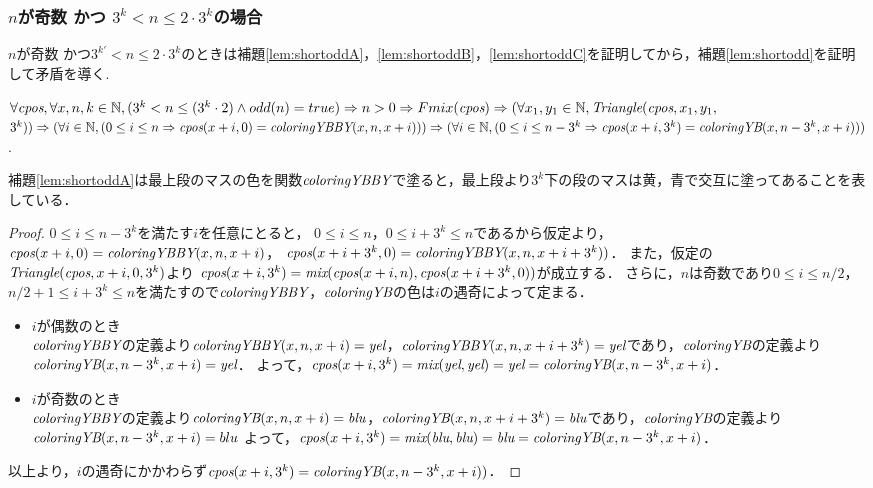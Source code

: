 \subsubsection{$n$が奇数 かつ $3^{k} < n \leq 2 \cdot 3^{k}$の場合}
$n$が奇数 かつ$3^{k'} < n \leq 2 \cdot 3^{k}$のときは補題\ref{lem:shortoddA}，\ref{lem:shortoddB}，\ref{lem:shortoddC}を証明してから，補題\ref{lem:shortodd}を証明して矛盾を導く.
\begin{lem}[\ShortOddA] \label{lem:shortoddA}
  $\forall \textit{cpos}, \forall x, n, k \in \mathbb{N},
  (3^k < n \leq (3^k\cdot2) \land odd(n) = true) \Rightarrow
  n > 0  \Rightarrow Fmix(\textit{cpos}) \Rightarrow 
  (\forall x_1, y_1 \in \mathbb{N}, \textit{Triangle}(\textit{cpos},x_1,y_1,$ $3^k)) \Rightarrow
  (\forall i \in \mathbb{N}, (0 \leq i \leq n \Rightarrow \textit{cpos}(x+i,0) = \textit{coloringYBBY}(x,n,x+i))) \Rightarrow
  (\forall i \in \mathbb{N}, (0 \leq i \leq n - 3^k \Rightarrow \textit{cpos}(x+i,3^k) = \textit{coloringYB}(x,n-3^k,x+i)))$.
\end{lem}
補題\ref{lem:shortoddA}は最上段のマスの色を関数$\textit{coloringYBBY}$で塗ると，最上段より$3^k$下の段のマスは黄，青で交互に塗ってあることを表している．
\begin{proof}
  $0 \leq i \leq n-3^k$を満たす$i$を任意にとると，
  $0 \leq i \leq n$，$0 \leq i+3^k \leq n$であるから仮定より，
  $\textit{cpos}(x+i,0) = \textit{coloringYBBY}(x,n,x+i)$，
  $\textit{cpos}(x+i+3^k,0) = \textit{coloringYBBY}(x,n,x+i+3^k))$．
  また，仮定の$\textit{Triangle}(\textit{cpos},x+i,0,3^k)$より
  $\textit{cpos}(x+i,3^k)=\textit{mix}(\textit{cpos}(x+i,n),\textit{cpos}(x+i+3^k,0))$が成立する．
  さらに，$n$は奇数であり$0 \leq i \leq n/2$，$n/2+1 \leq i+3^k \leq n$を満たすので$\textit{coloringYBBY}$，$\textit{coloringYB}$の色は$i$の遇奇によって定まる．
  \begin{itemize}
  \item
    $i$が偶数のとき \\
    $\textit{coloringYBBY}$の定義より$\textit{coloringYBBY}(x,n,x+i)=\textit{yel}$，$\textit{coloringYBBY}(x,n,x+i+3^k)=\textit{yel}$であり，$\textit{coloringYB}$の定義より$\textit{coloringYB}(x,n-3^k,x+i)=\textit{yel}$．
    よって，$\textit{cpos}(x+i,3^k)=\textit{mix}(\textit{yel},\textit{yel})=\textit{yel}=\textit{coloringYB}(x,n-3^k,x+i)$．
  \item
    $i$が奇数のとき \\
    $\textit{coloringYBBY}$の定義より$\textit{coloringYB}(x,n,x+i)=\textit{blu}$，$\textit{coloringYB}(x,n,x+i+3^k)=\textit{blu}$であり，$\textit{coloringYB}$の定義より$\textit{coloringYB}(x,n-3^k,x+i)=blu$
    よって，$\textit{cpos}(x+i,3^k)=\textit{mix}(\textit{blu},\textit{blu})=\textit{blu}=\textit{coloringYB}(x,n-3^k,x+i)$．
  \end{itemize}
  以上より，$i$の遇奇にかかわらず$\textit{cpos}(x+i,3^k) = \textit{coloringYB}(x,n-3^k,x+i))$．
\end{proof}

